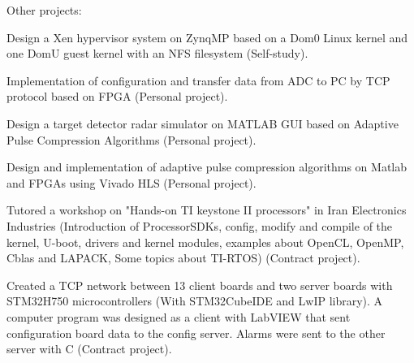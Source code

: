{}


\begin{cventries}

  \cventry
    {} %
    {Other projects:} %
    {} %
    {} %
    {
      \begin{cvitems} %
        \item {Design a Xen hypervisor system on ZynqMP based on a Dom0 Linux kernel and one DomU guest kernel with an NFS filesystem (Self-study).}
        \item {Implementation of configuration and transfer data from ADC to PC by TCP protocol based on FPGA (Personal project).}
        \item {Design a target detector radar simulator on MATLAB GUI based on Adaptive Pulse Compression Algorithms (Personal project).}
        \item {Design and implementation of adaptive pulse compression algorithms on Matlab and FPGAs using Vivado HLS (Personal project).}
	\item {Tutored a workshop on "Hands-on TI keystone II processors" in Iran Electronics Industries (Introduction of ProcessorSDKs, config, modify and compile of the kernel, U-boot, drivers and kernel modules, examples about OpenCL, OpenMP, Cblas and LAPACK, Some topics about TI-RTOS) (Contract project).}
	\item {Created a TCP network between 13 client boards and two server boards with STM32H750 microcontrollers (With STM32CubeIDE and LwIP library). A computer program was designed as a client with LabVIEW that sent configuration board data to the config server. Alarms were sent to the other server with C (Contract project).}
      \end{cvitems}
    }

\end{cventries}
